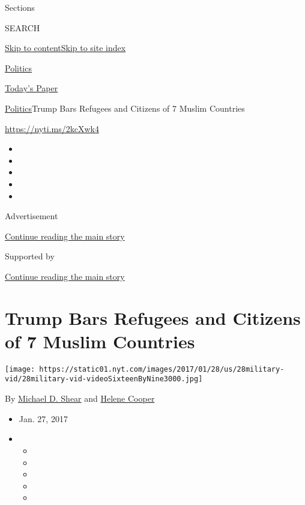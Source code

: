 Sections

SEARCH

\protect\hyperlink{site-content}{Skip to
content}\protect\hyperlink{site-index}{Skip to site index}

\href{https://www.nytimes.com/section/politics}{Politics}

\href{https://myaccount.nytimes.com/auth/login?response_type=cookie\&client_id=vi}{}

\href{https://www.nytimes.com/section/todayspaper}{Today's Paper}

\href{/section/politics}{Politics}\textbar{}Trump Bars Refugees and
Citizens of 7 Muslim Countries

\url{https://nyti.ms/2kcXwk4}

\begin{itemize}
\item
\item
\item
\item
\item
\end{itemize}

Advertisement

\protect\hyperlink{after-top}{Continue reading the main story}

Supported by

\protect\hyperlink{after-sponsor}{Continue reading the main story}

\hypertarget{trump-bars-refugees-and-citizens-of-7-muslim-countries}{%
\section{Trump Bars Refugees and Citizens of 7 Muslim
Countries}\label{trump-bars-refugees-and-citizens-of-7-muslim-countries}}

\texttt{[image: https://static01.nyt.com/images/2017/01/28/us/28military-vid/28military-vid-videoSixteenByNine3000.jpg]}

By \href{http://www.nytimes.com/by/michael-d-shear}{Michael D. Shear}
and \href{http://www.nytimes.com/by/helene-cooper}{Helene Cooper}

\begin{itemize}
\item
  Jan. 27, 2017
\item
  \begin{itemize}
  \item
  \item
  \item
  \item
  \item
  \end{itemize}
\end{itemize}

